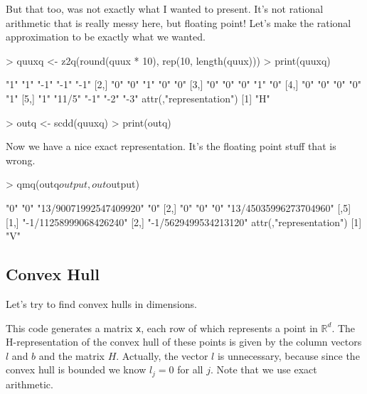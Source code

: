 \documentclass{article}
\newcommand{\real}{\mathbb{R}}
\begin{document}
But that too, was not exactly what I wanted to present.
It's not rational arithmetic that is really messy here,
but floating point!  Let's make the rational approximation
to be exactly what we wanted.
\begin{Schunk}
\begin{Sinput}
> quuxq <- z2q(round(quux * 10), rep(10, length(quux)))
> print(quuxq)
\end{Sinput}
\begin{Soutput}
     [,1] [,2]   [,3] [,4] [,5]
[1,] "1"  "1"    "-1" "-1" "-1"
[2,] "0"  "0"    "1"  "0"  "0" 
[3,] "0"  "0"    "0"  "1"  "0" 
[4,] "0"  "0"    "0"  "0"  "1" 
[5,] "1"  "11/5" "-1" "-2" "-3"
attr(,"representation")
[1] "H"
\end{Soutput}
\begin{Sinput}
> outq <- scdd(quuxq)
> print(outq)
\end{Sinput}
\end{Schunk}
Now we have a nice exact representation.  It's the floating
point stuff that is wrong.
\begin{Schunk}
\begin{Sinput}
> qmq(outq$output, out$output)
\end{Sinput}
\begin{Soutput}
     [,1] [,2] [,3]                   [,4]                  
[1,] "0"  "0"  "13/90071992547409920" "0"                   
[2,] "0"  "0"  "0"                    "13/45035996273704960"
     [,5]                  
[1,] "-1/11258999068426240"
[2,] "-1/5629499534213120" 
attr(,"representation")
[1] "V"
\end{Soutput}
\end{Schunk}

\subsection{Convex Hull} \label{sec:conv1}

Let's try to find convex hulls in \verb@d@ dimensions.
\begin{Schunk}
\end{Schunk}
This code generates a matrix \texttt{x}, each row of which represents
a point in $\real^d$.  The H-representation of the convex hull of these
points is given by the column vectors $l$ and $b$ and the matrix $H$.
Actually, the vector $l$ is unnecessary, because since the convex hull
is bounded we know $l_j = 0$ for all $j$.  Note that we use
exact arithmetic.
\end{document}
